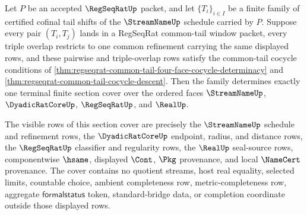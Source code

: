 \begin{theorem}
\label{thm:regseqrat-common-tail-terminal-section-cover}
Let $P$ be an accepted $\RegSeqRatUp$ packet, and let $\{T_i\}_{i \in I}$ be a finite family of certified cofinal tail shifts of the $\StreamNameUp$ schedule carried by $P$. Suppose every pair $(T_i,T_j)$ lands in a RegSeqRat common-tail window packet, every triple overlap restricts to one common refinement carrying the same displayed rows, and these pairwise and triple-overlap rows satisfy the common-tail cocycle conditions of \autoref{thm:regseqrat-common-tail-four-face-cocycle-determinacy} and \autoref{thm:regseqrat-common-tail-cocycle-descent}. Then the family determines exactly one terminal finite section cover over the ordered faces $\StreamNameUp$, $\DyadicRatCoreUp$, $\RegSeqRatUp$, and $\RealUp$.

The visible rows of this section cover are precisely the $\StreamNameUp$ schedule and refinement rows, the $\DyadicRatCoreUp$ endpoint, radius, and distance rows, the $\RegSeqRatUp$ classifier and regularity rows, the $\RealUp$ seal-source rows, componentwise $\hsame$, displayed $\Cont$, $\Pkg$ provenance, and local $\NameCert$ provenance. The cover contains no quotient streams, host real equality, selected limits, countable choice, ambient completeness row, metric-completeness row, aggregate $\mathsf{formalstatus}$ token, standard-bridge data, or completion coordinate outside those displayed rows.
\end{theorem}
